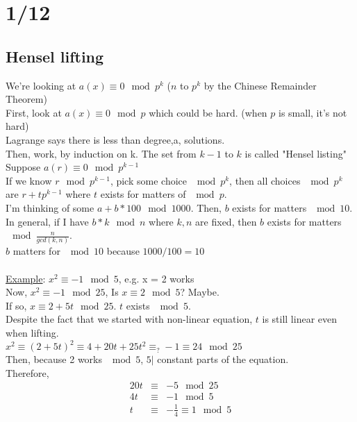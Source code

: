 \section*{1/12}
  \subsection*{Hensel lifting}
    We're looking at $a(x) \equiv 0 \mod p^k$ ($n$ to $p^k$ by the Chinese 
    Remainder Theorem)\\
    First, look at $a(x) \equiv 0 \mod p$ which could be hard. (when $p$ is
    small, it's not hard)\\
    Lagrange says there is less than degree,a, solutions.\\
    Then, work, by induction on k. The set from $k-1$ to $k$ is called "Hensel
    listing"\\
    Suppose $a(r) \equiv 0 \mod p^{k-1}$\\
    If we know $r \mod p^{k-1}$, pick some choice $\mod p^k$, then all choices
    $\mod p^k$ are $r + tp^{k-1}$ where $t$ exists for matters of $\mod p$.\\
    I'm thinking of some $a+b*100 \mod 1000$. Then, $b$ exists for matters
    $\mod 10$.\\
    In general, if I have $b*k \mod n$ where $k,n$ are fixed, then $b$ exists
    for matters $\mod \frac{n}{gcd(k,n)}$.\\
    $b$ matters for $\mod 10$ because $1000/100 = 10$\\\\
    \underline{Example}: $x^2 \equiv -1 \mod 5$, e.g. x = 2 works\\
    Now, $x^2 \equiv -1 \mod 25$, Is $x \equiv 2 \mod 5$? Maybe.\\
    If so, $x \equiv 2 + 5t \mod 25$. $t$ exists $\mod 5$.\\
    Despite the fact that we started with non-linear equation, $t$ is still
    linear even when lifting.\\
    $x^2 \equiv (2+5t)^2 \equiv 4 + 20t + 25t^2 \equiv_? -1 \equiv 24 \mod 25$\\
    Then, because 2 works $\mod 5$, $5 |$ constant parts of the equation.\\
    Therefore, 
    \begin{eqnarray*}
      20t &\equiv & -5 \mod 25\\
      4t & \equiv & -1 \mod 5\\
      t &\equiv& -\frac{1}{4} \equiv 1 \mod 5\\
    \end{eqnarray*}
